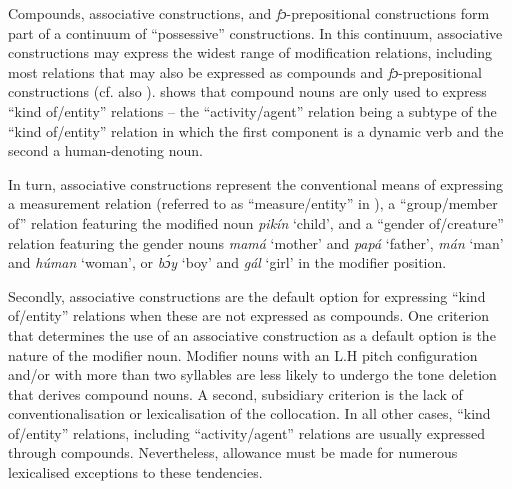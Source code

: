\begin{table}
\caption{Tendencies of nominal compounding}
\label{tab:key:4.5}
\end{table}

Compounds, associative constructions, and \textit{fɔ}{}-prepositional constructions form part of a continuum of “possessive” constructions. In this continuum, associative constructions may express the widest range of modification relations, including most relations that may also be expressed as compounds and \textit{fɔ}{}-prepositional constructions (cf. also ).  shows that compound nouns are only used to express “kind of/entity” relations – the “activity/agent” relation being a subtype of the “kind of/entity” relation in which the first component is a dynamic verb and the second a human-denoting noun.


In turn, associative constructions represent the conventional means of expressing a measurement relation (referred to as “measure\slash entity” in ), a “group\slash member of” relation featuring the modified noun \textit{pikín} ‘child’, and a “gender of\slash creature” relation featuring the gender nouns \textit{mamá} ‘mother’ and \textit{papá} ‘father’, \textit{mán} ‘man’ and \textit{húman} ‘woman’, or \textit{bɔ́y} ‘boy’ and \textit{gál} ‘girl’ in the modifier position. 



Secondly, associative constructions are the default option for expressing “kind of\slash entity” relations when these are not expressed as compounds. One criterion that determines the use of an associative construction as a default option is the nature of the modifier noun. Modifier nouns with an L.H pitch configuration and/or with more than two syllables are less likely to undergo the tone deletion that derives compound nouns. A second, subsidiary criterion is the lack of conventionalisation or lexicalisation of the collocation. In all other cases, “kind of\slash entity” relations, including “activity\slash agent” relations are usually expressed through compounds. Nevertheless, allowance must be made for numerous lexicalised exceptions to these tendencies.




